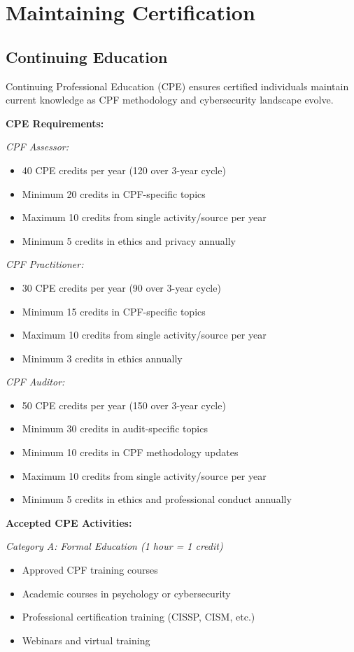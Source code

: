 \documentclass[11pt,a4paper]{article}
\begin{document}
\section{Maintaining Certification}

\subsection{Continuing Education}

Continuing Professional Education (CPE) ensures certified individuals maintain current knowledge as CPF methodology and cybersecurity landscape evolve.

\textbf{CPE Requirements:}

\textit{CPF Assessor:}
\begin{itemize}
\item 40 CPE credits per year (120 over 3-year cycle)
\item Minimum 20 credits in CPF-specific topics
\item Maximum 10 credits from single activity/source per year
\item Minimum 5 credits in ethics and privacy annually
\end{itemize}

\textit{CPF Practitioner:}
\begin{itemize}
\item 30 CPE credits per year (90 over 3-year cycle)
\item Minimum 15 credits in CPF-specific topics
\item Maximum 10 credits from single activity/source per year
\item Minimum 3 credits in ethics annually
\end{itemize}

\textit{CPF Auditor:}
\begin{itemize}
\item 50 CPE credits per year (150 over 3-year cycle)
\item Minimum 30 credits in audit-specific topics
\item Minimum 10 credits in CPF methodology updates
\item Maximum 10 credits from single activity/source per year
\item Minimum 5 credits in ethics and professional conduct annually
\end{itemize}

\textbf{Accepted CPE Activities:}

\textit{Category A: Formal Education (1 hour = 1 credit)}
\begin{itemize}
\item Approved CPF training courses
\item Academic courses in psychology or cybersecurity
\item Professional certification training (CISSP, CISM, etc.)
\item Webinars and virtual training
\end{itemize}
\end{document}
